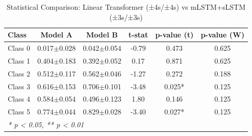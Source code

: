 \begin{table}[htbp]
\centering
\caption{Statistical Comparison: Linear Transformer (±4s/±4s) vs mLSTM+sLSTM (±3s/±3s)}
\label{tab:comparison_class_linear_transformer_±4s_±4s_vs_mlstmslstm_±3s_±3s}
\begin{tabular}{lccccc}
\toprule
\textbf{Class} & \textbf{Model A} & \textbf{Model B} & \textbf{t-stat} & \textbf{p-value (t)} & \textbf{p-value (W)} \\
\midrule
Class 0 & 0.017$\pm$0.028 & 0.042$\pm$0.054 & -0.79 & 0.473 & 0.625 \\
Class 1 & 0.404$\pm$0.183 & 0.392$\pm$0.052 & 0.17 & 0.871 & 0.625 \\
Class 2 & 0.512$\pm$0.117 & 0.562$\pm$0.046 & -1.27 & 0.272 & 0.188 \\
Class 3 & 0.616$\pm$0.153 & 0.706$\pm$0.101 & -3.48 & 0.025* & 0.125 \\
Class 4 & 0.584$\pm$0.054 & 0.496$\pm$0.123 & 1.80 & 0.146 & 0.125 \\
Class 5 & 0.774$\pm$0.044 & 0.829$\pm$0.028 & -3.40 & 0.027* & 0.125 \\
\bottomrule
\multicolumn{6}{l}{\textit{* p < 0.05, ** p < 0.01}} \\
\end{tabular}
\end{table}